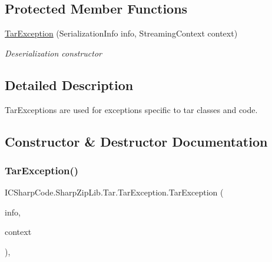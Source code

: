 \subsection*{Protected Member Functions}
\begin{DoxyCompactItemize}
\item 
\hyperlink{class_i_c_sharp_code_1_1_sharp_zip_lib_1_1_tar_1_1_tar_exception_aa661d3493d6aeb7c5b12f63b6f374ff6}{Tar\+Exception} (Serialization\+Info info, Streaming\+Context context)
\begin{DoxyCompactList}\small\item\em Deserialization constructor \end{DoxyCompactList}\end{DoxyCompactItemize}


\subsection{Detailed Description}
Tar\+Exceptions are used for exceptions specific to tar classes and code. 



\subsection{Constructor \& Destructor Documentation}
\mbox{\label{class_i_c_sharp_code_1_1_sharp_zip_lib_1_1_tar_1_1_tar_exception_aa661d3493d6aeb7c5b12f63b6f374ff6}} 
\subsubsection{\texorpdfstring{Tar\+Exception()}{TarException()}\hspace{0.1cm}{\footnotesize\ttfamily [1/4]}}
{\footnotesize\ttfamily I\+C\+Sharp\+Code.\+Sharp\+Zip\+Lib.\+Tar.\+Tar\+Exception.\+Tar\+Exception (\begin{DoxyParamCaption}\item[{Serialization\+Info}]{info,  }\item[{Streaming\+Context}]{context }\end{DoxyParamCaption})\hspace{0.3cm}{\ttfamily [inline]}, {\ttfamily [protected]}}



